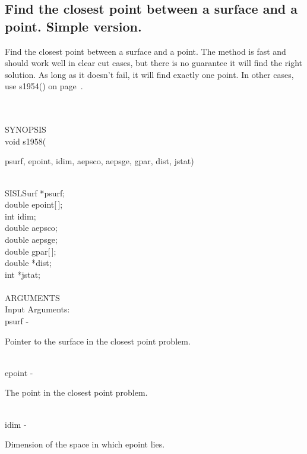 \subsection{Find the closest point between a surface and a point.
Simple version.}
\begin{minipg1}
  Find the closest point between a surface and a point.
  The method is fast and should work well in clear cut cases, but there is
  no guarantee it will find the right solution. As long as it doesn't
  fail, it will find exactly one point.  In other cases, use s1954() on
  page~\pageref{s1954}.
\end{minipg1}\\ \\
SYNOPSIS\\
        \>void s1958(\begin{minipg3}
          {\fov psurf}, {\fov epoint}, {\fov idim}, {\fov aepsco}, {\fov aepsge}, {\fov gpar}, {\fov dist}, {\fov jstat})
        \end{minipg3}\\[0.3ex]
        \>\>    SISLSurf \> *{\fov psurf};\\
        \>\>    double   \> {\fov epoint}[\,];\\
        \>\>    int      \> {\fov idim};\\
        \>\>    double   \> {\fov aepsco};\\
        \>\>    double   \> {\fov aepsge};\\
        \>\>    double   \> {\fov gpar}[\,];\\
        \>\>    double   \> *{\fov dist};\\
        \>\>    int    \>  *{\fov jstat};\\
\\
ARGUMENTS\\
        \>Input Arguments:\\
        \>\>    {\fov psurf}\> - \>  \begin{minipg2}
                     Pointer to the surface in the closest point problem.
                               \end{minipg2}\\
        \>\>    {\fov epoint}\> - \>  \begin{minipg2}
                     The point in the closest point problem.
                               \end{minipg2}\\
        \>\>    {\fov idim}\> - \>  \begin{minipg2}
                     Dimension of the space in which epoint lies.
                               \end{minipg2}\\
